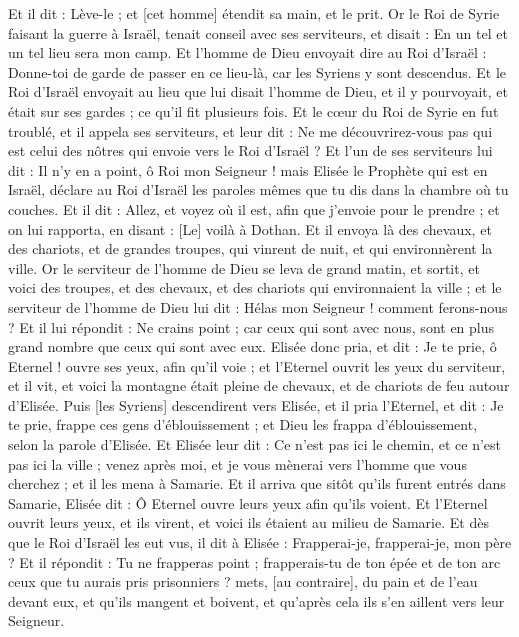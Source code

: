 \begin{multicols}{2}
Et il dit : Lève-le ; et [cet homme] étendit sa main, et le prit.
Or le Roi de Syrie faisant la guerre à Israël, tenait conseil avec ses serviteurs, et disait : En un tel et un tel lieu sera mon camp.
Et l'homme de Dieu envoyait dire au Roi d'Israël : Donne-toi de garde de passer en ce lieu-là, car les Syriens y sont descendus.
Et le Roi d'Israël envoyait au lieu que lui disait l'homme de Dieu, et il y pourvoyait, et était sur ses gardes ; ce qu'il fit plusieurs fois.
Et le cœur du Roi de Syrie en fut troublé, et il appela ses serviteurs, et leur dit : Ne me découvrirez-vous pas qui est celui des nôtres qui envoie vers le Roi d'Israël ?
Et l'un de ses serviteurs lui dit : Il n'y en a point, ô Roi mon Seigneur ! mais Elisée le Prophète qui est en Israël, déclare au Roi d'Israël les paroles mêmes que tu dis dans la chambre où tu couches.
Et il dit : Allez, et voyez où il est, afin que j'envoie pour le prendre ; et on lui rapporta, en disant : [Le] voilà à Dothan.
Et il envoya là des chevaux, et des chariots, et de grandes troupes, qui vinrent de nuit, et qui environnèrent la ville.
Or le serviteur de l'homme de Dieu se leva de grand matin, et sortit, et voici des troupes, et des chevaux, et des chariots qui environnaient la ville ; et le serviteur de l'homme de Dieu lui dit : Hélas mon Seigneur ! comment ferons-nous ?
Et il lui répondit : Ne crains point ; car ceux qui sont avec nous, sont en plus grand nombre que ceux qui sont avec eux.
Elisée donc pria, et dit : Je te prie, ô Eternel ! ouvre ses yeux, afin qu'il voie ; et l'Eternel ouvrit les yeux du serviteur, et il vit, et voici la montagne était pleine de chevaux, et de chariots de feu autour d'Elisée.
Puis [les Syriens] descendirent vers Elisée, et il pria l'Eternel, et dit : Je te prie, frappe ces gens d'éblouissement ; et Dieu les frappa d'éblouissement, selon la parole d'Elisée.
Et Elisée leur dit : Ce n'est pas ici le chemin, et ce n'est pas ici la ville ; venez après moi, et je vous mènerai vers l'homme que vous cherchez ; et il les mena à Samarie.
Et il arriva que sitôt qu'ils furent entrés dans Samarie, Elisée dit : Ô Eternel ouvre leurs yeux afin qu'ils voient. Et l'Eternel ouvrit leurs yeux, et ils virent, et voici ils étaient au milieu de Samarie.
Et dès que le Roi d'Israël les eut vus, il dit à Elisée : Frapperai-je, frapperai-je, mon père ?
Et il répondit : Tu ne frapperas point ; frapperais-tu de ton épée et de ton arc ceux que tu aurais pris prisonniers ? mets, [au contraire], du pain et de l'eau devant eux, et qu'ils mangent et boivent, et qu'après cela ils s'en aillent vers leur Seigneur.

\end{multicols}
